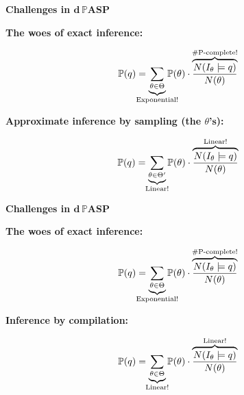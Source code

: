 \documentclass[aspectratio=169]{beamer}
\newcommand{\dpaspnc}{\textbf{$\bm{d}$\,$\pmb{\mathbb{P}}$ASP}}
\begin{document}
\begin{frame}[fragile]{\textbf{Challenges in \dpaspnc}}
\footnotesize

{\bfseries\color{palette-orange}The woes of exact inference:}

\begin{equation*}
  \mathbb{P}(q)=\underbrace{\sum_{\theta\in\Theta}}_{\mathclap{\text{Exponential!}}}\mathbb{P}(\theta)\cdot\overbrace{\frac{N(I_\theta\models q)}{N(\theta)}}^{\mathclap{\text{\#P-complete!}}}
\end{equation*}

\vspace{0.5cm}

{\bfseries\color{palette-orange}Approximate inference by sampling (the $\theta$'s):}

\begin{equation*}
  \mathbb{P}(q)=\underbrace{\sum_{\theta\in\Theta'}}_{\mathclap{\text{Linear!}}}\mathbb{P}(\theta)\cdot\overbrace{\frac{N(I_\theta\models q)}{N(\theta)}}^{\mathclap{\text{Linear!}}}
\end{equation*}

\end{frame}


\begin{frame}[fragile]{\textbf{Challenges in \dpaspnc}}
\footnotesize

{\bfseries\color{palette-orange}The woes of exact inference:}

\begin{equation*}
  \mathbb{P}(q)=\underbrace{\sum_{\theta\in\Theta}}_{\mathclap{\text{Exponential!}}}\mathbb{P}(\theta)\cdot\overbrace{\frac{N(I_\theta\models q)}{N(\theta)}}^{\mathclap{\text{\#P-complete!}}}
\end{equation*}

\vspace{0.5cm}

{\bfseries\color{palette-orange}Inference by compilation:}

\begin{equation*}
  \mathbb{P}(q)=\underbrace{\sum_{\theta\in\Theta}}_{\mathclap{\text{Linear!}}}\mathbb{P}(\theta)\cdot\overbrace{\frac{N(I_\theta\models q)}{N(\theta)}}^{\mathclap{\text{Linear!}}}
\end{equation*}

\end{frame}
\end{document}
